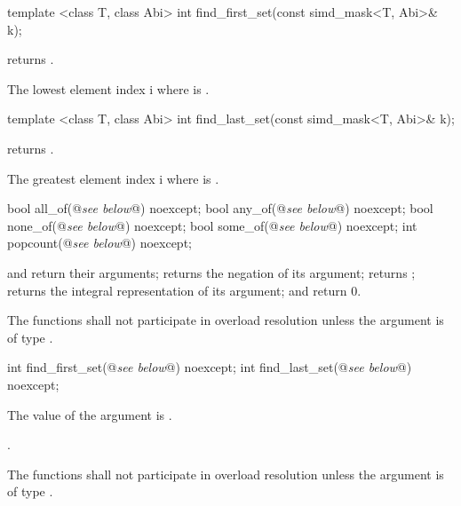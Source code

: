 \begin{itemdecl}
template <class T, class Abi> int find_first_set(const simd_mask<T, Abi>& k);
\end{itemdecl}
\begin{itemdescr}
  \pnum\requires {} returns \true.

  \pnum\returns The lowest element index \code i where  is \true.
\end{itemdescr}

\begin{itemdecl}
template <class T, class Abi> int find_last_set(const simd_mask<T, Abi>& k);
\end{itemdecl}
\begin{itemdescr}
  \pnum\requires {} returns \true.

  \pnum\returns The greatest element index \code i where  is \true.
\end{itemdescr}

\begin{itemdecl}
bool  all_of(@\emph{see below}@) noexcept;
bool  any_of(@\emph{see below}@) noexcept;
bool none_of(@\emph{see below}@) noexcept;
bool some_of(@\emph{see below}@) noexcept;
int popcount(@\emph{see below}@) noexcept;
\end{itemdecl}
\begin{itemdescr}
  \pnum\returns {} and  return their arguments;  returns the negation of its argument;  returns \false;  returns the integral representation of its argument;  and  return 0.

  \pnum\remarks The functions shall not participate in overload resolution unless the argument is of type \bool.
\end{itemdescr}

\begin{itemdecl}
int find_first_set(@\emph{see below}@) noexcept;
int find_last_set(@\emph{see below}@) noexcept;
\end{itemdecl}
\begin{itemdescr}
  \pnum\requires The value of the argument is \true.

  \pnum\returns {}.

  \pnum\remarks The functions shall not participate in overload resolution unless the argument is of type \bool.
\end{itemdescr}

